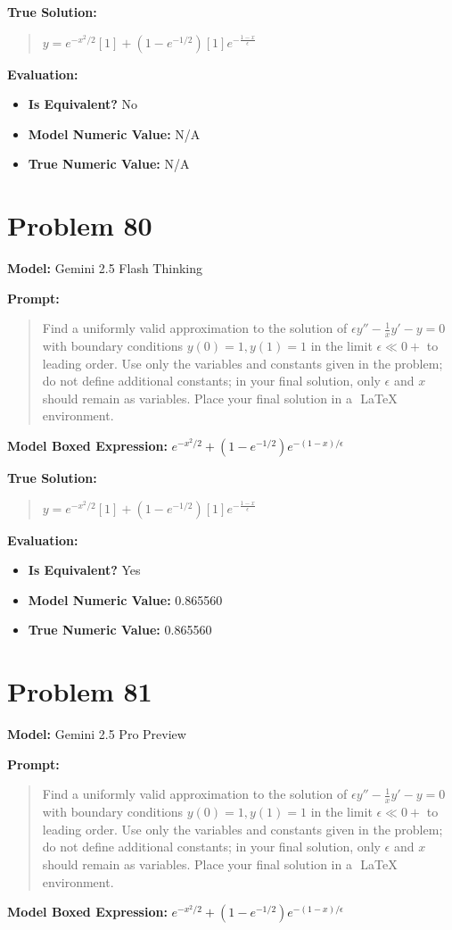 \documentclass{article}
\begin{document}
{\textbf{True Solution:}
\begin{quote}
$y =e^{-x^2/2} \left[ 1 \right]+ (1 - e^{-1/2}) \left[1 \right] e^{-\frac{1 - x}{\epsilon}}$
\end{quote}

\textbf{Evaluation:}
\begin{itemize}
\item \textbf{Is Equivalent?} No
\item \textbf{Model Numeric Value:} N/A
\item \textbf{True Numeric Value:} N/A
\end{itemize}
\vspace{1cm}
\section*{Problem 80}
\textbf{Model:} Gemini 2.5 Flash Thinking

\textbf{Prompt:}
\begin{quote}
Find a uniformly valid approximation to the solution of $\epsilon y'' - \frac{1}{x} y' - y = 0$ with boundary conditions $y(0) = 1, y(1) = 1$ in the limit $\epsilon \ll 0+$ to leading order. Use only the variables and constants given in the problem; do not define additional constants; in your final solution, only $\epsilon$ and $x$ should remain as variables. Place your final solution in a $\boxed{}$ LaTeX environment.
\end{quote}
\textbf{Model Boxed Expression:} $e^{-x^2/2} + (1-e^{-1/2})e^{-(1-x)/\epsilon}$

\textbf{True Solution:}
\begin{quote}
$y =e^{-x^2/2} \left[ 1 \right]+ (1 - e^{-1/2}) \left[1 \right] e^{-\frac{1 - x}{\epsilon}}$
\end{quote}

\textbf{Evaluation:}
\begin{itemize}
\item \textbf{Is Equivalent?} Yes
\item \textbf{Model Numeric Value:} 0.865560
\item \textbf{True Numeric Value:} 0.865560
\end{itemize}
\vspace{1cm}
\section*{Problem 81}
\textbf{Model:} Gemini 2.5 Pro Preview

\textbf{Prompt:}
\begin{quote}
Find a uniformly valid approximation to the solution of $\epsilon y'' - \frac{1}{x} y' - y = 0$ with boundary conditions $y(0) = 1, y(1) = 1$ in the limit $\epsilon \ll 0+$ to leading order. Use only the variables and constants given in the problem; do not define additional constants; in your final solution, only $\epsilon$ and $x$ should remain as variables. Place your final solution in a $\boxed{}$ LaTeX environment.
\end{quote}
\textbf{Model Boxed Expression:} $e^{-x^2/2} + (1-e^{-1/2})e^{-(1-x)/\epsilon}$

}
\end{document}
